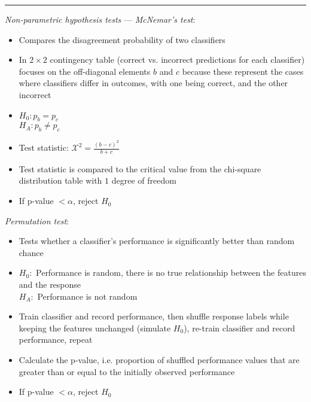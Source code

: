 {\color{lightgray}\hrule height 0.001mm}

\emph{Non-parametric hypothesis tests} --- 
\emph{McNemar’s test}:
\begin{itemize}
    \item Compares the disagreement probability of two classifiers 
    \item In $2 \times 2$ contingency table (correct vs. incorrect predictions for each classifier) focuses on the off-diagonal elements $b$ and $c$ because these represent the cases where classifiers differ in outcomes, with one being correct, and the other incorrect
    \item $H_0: p_b = p_c$\\
    $H_A: p_b \neq p_c$
    \item Test statistic: $\mathcal{X}^2 = \frac{(b-c)^2}{b+c}$
    \item Test statistic is compared to the critical value from the chi-square distribution table with $1$ degree of freedom
    \item If p-value $< \alpha$, reject $H_0$
\end{itemize}
\emph{Permutation test}:
\begin{itemize}
    \item Tests whether a classifier's performance is significantly better than random chance
    \item $H_0:$ Performance is random, there is no true relationship between the features and the response\\
    $H_A:$ Performance is not random
    \item Train classifier and record performance, then shuffle response labels while keeping the features unchanged (simulate $H_0$), re-train classifier and record performance, repeat
    \item Calculate the p-value, i.e. proportion of shuffled performance values that are greater than or equal to the initially observed performance
    \item If p-value $< \alpha$, reject $H_0$
\end{itemize}